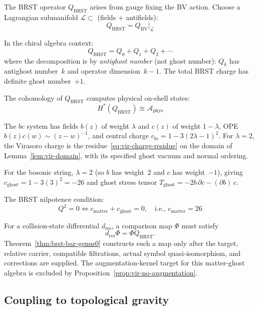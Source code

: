 \begin{definition}
The BRST operator $Q_{\text{BRST}}$ arises from gauge fixing the BV action. 
Choose a Lagrangian submanifold $\mathcal{L} \subset$ (fields + antifields):
\[Q_{\text{BRST}} = Q_{\text{BV}}|_{\mathcal{L}}\]

In the chiral algebra context:
\[Q_{\text{BRST}} = Q_0 + Q_1 + Q_2 + \cdots\]
where the decomposition is by \emph{antighost number} (not ghost number): $Q_k$ has antighost number~$k$ and operator dimension~$k-1$.  The total BRST charge has definite ghost number~$+1$.
\end{definition}

\begin{theorem}[BRST cohomology = physical states; \ClaimStatusProvedElsewhere{} \cite{CG17}]
\label{thm:brst-physical-states}
The cohomology of $Q_{\text{BRST}}$ computes physical on-shell states:
\[H^*(Q_{\text{BRST}}) \cong \mathcal{A}_{\text{phys}}\]
\end{theorem}

\begin{example}
The $bc$ system has fields $b(z)$ of weight $\lambda$ and $c(z)$ of weight $1-\lambda$, OPE $b(z)c(w)\sim(z-w)^{-1}$, and central charge $c_{bc}=1-3(2\lambda-1)^2$.
For $\lambda=2$, the Virasoro charge is the residue~\eqref{eq:vir-charge-residue} on the domain of Lemma~\ref{lem:vir-domain}, with its specified ghost vacuum and normal ordering.

For the bosonic string, $\lambda = 2$ (so $b$ has weight~$2$ and $c$ has weight~$-1$), giving $c_{\text{ghost}} = 1 - 3(3)^2 = -26$ and ghost stress tensor $T_{\text{ghost}} = -2b\,\partial c - (\partial b)\,c$.

The BRST nilpotence condition:
\[Q^2 = 0 \iff c_{\text{matter}} + c_{\text{ghost}} = 0, \quad \text{i.e., } c_{\text{matter}} = 26\]

For a collision-state differential $d_{\mathrm{res}}$, a comparison map $\Phi$ must satisfy
\[d_{\mathrm{res}}\Phi=\Phi Q_{\mathrm{BRST}}.\]
Theorem~\ref{thm:brst-bar-genus0} constructs such a map only after the target, relative carrier, compatible filtrations, actual symbol quasi-isomorphism, and corrections are supplied.
The augmentation-kernel target for this matter-ghost algebra is excluded by Proposition~\ref{prop:vir-no-augmentation}.
\end{example}

\subsection{Coupling to topological gravity}

